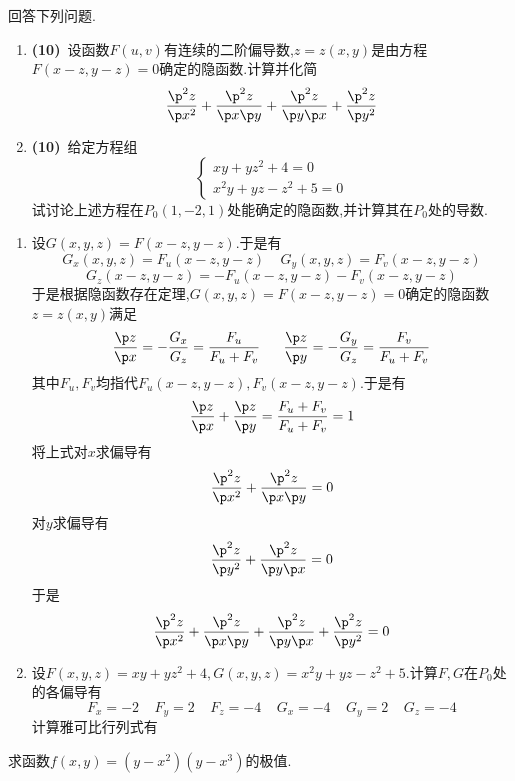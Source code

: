 \documentclass{ctexart}
\begin{document}
\begin{problem}[2.(20\songti{分})]
    回答下列问题.
    \begin{enumerate}[label=\tbf{(\arabic*)}]
        \item \textbf{(10)}\ 设函数$F(u,v)$有连续的二阶偏导数,$z=z(x,y)$是由方程$F(x-z,y-z)=0$确定的隐函数.计算并化简
            \[\dfrac{\p^2z}{\p x^2}+\dfrac{\p^2z}{\p x\p y}+\dfrac{\p^2z}{\p y\p x}+\dfrac{\p^2z}{\p y^2}\]
        \item \textbf{(10)}\ 给定方程组
            \[\left\{\begin{array}{l}
                xy+yz^2+4=0\\
                x^2y+yz-z^2+5=0
            \end{array}\right.\]
            试讨论上述方程在$P_0\left(1,-2,1\right)$处能确定的隐函数,并计算其在$P_0$处的导数.
    \end{enumerate}
\end{problem}
\begin{solution}
    \begin{enumerate}[label=\tbf{(\arabic*)}]
        \item 设$G(x,y,z)=F(x-z,y-z)$.于是有
            \[G_x(x,y,z)=F_u(x-z,y-z)\ \ \ \ \ G_y(x,y,z)=F_v(x-z,y-z)\]
            \[G_z(x-z,y-z)=-F_u(x-z,y-z)-F_v(x-z,y-z)\]
            于是根据隐函数存在定理,$G(x,y,z)=F(x-z,y-z)=0$确定的隐函数$z=z(x,y)$满足
            \[\dfrac{\p z}{\p x}=-\dfrac{G_x}{G_z}=\dfrac{F_u}{F_u+F_v}\ \ \ \ \ \dfrac{\p z}{\p y}=-\dfrac{G_y}{G_z}=\dfrac{F_v}{F_u+F_v}\]
            其中$F_u,F_v$均指代$F_u(x-z,y-z),F_v(x-z,y-z)$.于是有
            \[\dfrac{\p z}{\p x}+\dfrac{\p z}{\p y}=\dfrac{F_u+F_v}{F_u+F_v}=1\]
            将上式对$x$求偏导有
            \[\dfrac{\p^2 z}{\p x^2}+\dfrac{\p^2 z}{\p x\p y}=0\]
            对$y$求偏导有
            \[\dfrac{\p^2 z}{\p y^2}+\dfrac{\p^2 z}{\p y\p x}=0\]
            于是\[\dfrac{\p^2z}{\p x^2}+\dfrac{\p^2z}{\p x\p y}+\dfrac{\p^2z}{\p y\p x}+\dfrac{\p^2z}{\p y^2}=0\]
        \item 设$F(x,y,z)=xy+yz^2+4,G(x,y,z)=x^2y+yz-z^2+5$.计算$F,G$在$P_0$处的各偏导有
            \[F_x=-2\ \ \ \ \ F_y=2\ \ \ \ \ F_z=-4\ \ \ \ \ G_x=-4\ \ \ \ \ G_y=2\ \ \ \ \ G_z=-4\]
            计算雅可比行列式有

    \end{enumerate}
\end{solution}
\begin{problem}[3.(20\songti{分})]
    求函数$f(x,y)=\left(y-x^2\right)\left(y-x^3\right)$的极值.
\end{problem}
\end{document}
